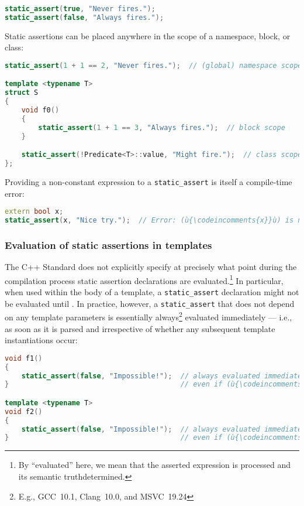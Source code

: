 \begin{lstlisting}[language=C++]
static_assert(true, "Never fires.");
static_assert(false, "Always fires.");
\end{lstlisting}
    
\noindent Static assertions can be placed anywhere in the scope of a namespace,
block, or class:

\begin{lstlisting}[language=C++]
static_assert(1 + 1 == 2, "Never fires.");  // (global) namespace scope

template <typename T>
struct S
{
    void f0()
    {
        static_assert(1 + 1 == 3, "Always fires.");  // block scope
    }

    static_assert(!Predicate<T>::value, "Might fire.");  // class scope
};
\end{lstlisting}
    
\noindent Providing a non-constant expression to a \lstinline!static_assert! is
itself a compile-time error:

\begin{lstlisting}[language=C++]
extern bool x;
static_assert(x, "Nice try.");  // Error: (ù{\codeincomments{x}}ù) is not a compile-time constant.
\end{lstlisting}
    

\subsubsection[Evaluation of static assertions in templates]{Evaluation of static assertions in templates}\label{evaluation-of-static-assertions-in-templates}

The C++ Standard does not explicitly specify at precisely what point during
the compilation process static assertion declarations are
evaluated.{\cprotect\footnote{By ``evaluated'' here, we mean that the
  asserted expression is processed and its semantic truth\linebreak[4] determined.}}
In particular, when used within the body of a template, a
\lstinline!static_assert! declaration might not be evaluated until
. In practice, however, a
\lstinline!static_assert! that does not depend on any template parameters
is essentially always{\cprotect\footnote{E.g.,
GCC~10.1, Clang~10.0, and MSVC~19.24}} evaluated immediately --- i.e., as
soon as it is parsed and irrespective of whether any subsequent template
instantiations occur:

\begin{lstlisting}[language=C++]
void f1()
{
    static_assert(false, "Impossible!");  // always evaluated immediately...
}                                         // even if (ù{\codeincomments{f1()}}ù) is never invoked

template <typename T>
void f2()
{
    static_assert(false, "Impossible!");  // always evaluated immediately...
}                                         // even if (ù{\codeincomments{f2()}}ù) is never instantiated
\end{lstlisting}
    
